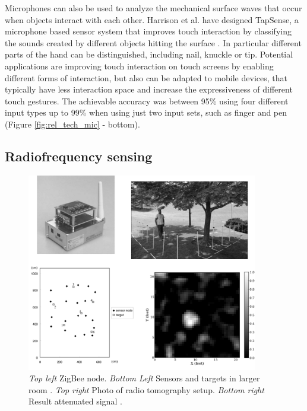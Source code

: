Microphones can also be used to analyze the mechanical surface waves that occur when objects interact with each other. Harrison et al. have designed TapSense, a microphone based sensor system that improves touch interaction by classifying the sounds created by different objects hitting the surface \cite{harrison2011tapsense}. In particular different parts of the hand can be distinguished, including nail, knuckle or tip. Potential applications are improving touch interaction on touch screens by enabling different forms of interaction, but also can be adapted to mobile devices, that typically have less interaction space and increase the expressiveness of different touch gestures. The achievable accuracy was between 95\% using four different input types up to 99\% when using just two input sets, such as finger and pen (Figure \ref{fig:rel_tech_mic} - bottom).

\subsection{Radiofrequency sensing}
\begin{figure}[h]
\centering
\includegraphics[width=0.9\textwidth]{images/tech_mic1}
\caption{\emph{Top left} ZigBee node. \emph{Bottom Left} Sensors and targets in larger room \cite{sugano2006indoor}. \emph{Top right} Photo of radio tomography setup. \emph{Bottom right} Result attenuated signal \cite{wilson2010radio}.}
\label{fig:tech_mic1}
\end{figure}

